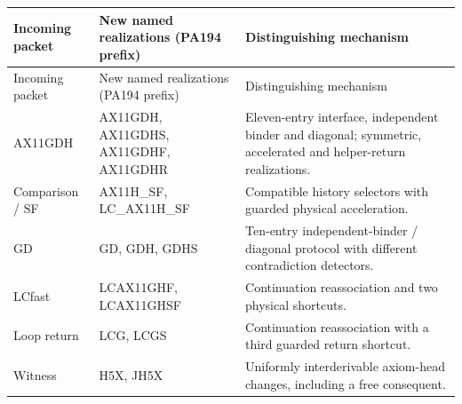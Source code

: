 \begin{center}\small
\begin{longtable}{>{\raggedright\arraybackslash}p{1.0in}>{\raggedright\arraybackslash}p{2.35in}>{\raggedright\arraybackslash}p{2.85in}}
\toprule
Incoming packet & New named realizations (PA194 prefix) & Distinguishing mechanism\\
\midrule\endfirsthead
\toprule
Incoming packet & New named realizations (PA194 prefix) & Distinguishing mechanism\\
\midrule\endhead
\bottomrule\endfoot
AX11GDH&AX11GDH, AX11GDHS, AX11GDHF, AX11GDHR&Eleven-entry interface, independent binder and diagonal; symmetric, accelerated and helper-return realizations.\\[0.5em]
Comparison / SF&AX11H\_SF, LC\_AX11H\_SF&Compatible history selectors with guarded physical acceleration.\\[0.5em]
GD&GD, GDH, GDHS&Ten-entry independent-binder / diagonal protocol with different contradiction detectors.\\[0.5em]
LCfast&LCAX11GHF, LCAX11GHSF&Continuation reassociation and two physical shortcuts.\\[0.5em]
Loop return&LCG, LCGS&Continuation reassociation with a third guarded return shortcut.\\[0.5em]
Witness&H5X, JH5X&Uniformly interderivable axiom-head changes, including a free consequent.\\[0.5em]
\end{longtable}
\end{center}

